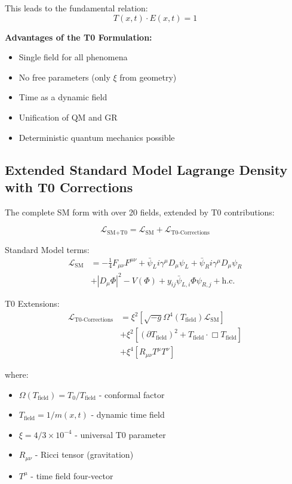 	This leads to the fundamental relation:
	\begin{equation}
		\boxed{T(x,t) \cdot E(x,t) = 1}
	\end{equation}
	
	\textbf{Advantages of the T0 Formulation:}
	\begin{itemize}
		\item Single field for all phenomena
		\item No free parameters (only $\xi$ from geometry)
		\item Time as a dynamic field
		\item Unification of QM and GR
		\item Deterministic quantum mechanics possible
	\end{itemize}
	
	\subsection{Extended Standard Model Lagrange Density with T0 Corrections}
	
	The complete SM form with over 20 fields, extended by T0 contributions:
	
	\begin{smbox}
		\begin{equation}
			\mathcal{L}_{\text{SM+T0}} = \mathcal{L}_{\text{SM}} + \mathcal{L}_{\text{T0-Corrections}}
		\end{equation}
		
		Standard Model terms:
		\begin{align}
			\mathcal{L}_{\text{SM}} &= -\frac{1}{4}F_{\mu\nu}F^{\mu\nu} + \bar{\psi}_L i\gamma^\mu D_\mu \psi_L + \bar{\psi}_R i\gamma^\mu D_\mu \psi_R \\
			&+ |D_\mu \Phi|^2 - V(\Phi) + y_{ij}\bar{\psi}_{L,i}\Phi\psi_{R,j} + \text{h.c.}
		\end{align}
		
		T0 Extensions:
		\begin{align}
			\mathcal{L}_{\text{T0-Corrections}} &= \xi^2 \left[ \sqrt{-g} \Omega^4(T_{\text{field}}) \mathcal{L}_{\text{SM}} \right] \\
			&+ \xi^2 \left[ (\partial T_{\text{field}})^2 + T_{\text{field}} \cdot \Box T_{\text{field}} \right] \\
			&+ \xi^4 \left[ R_{\mu\nu} T^{\mu} T^{\nu} \right]
		\end{align}
		
		where:
		\begin{itemize}
			\item $\Omega(T_{\text{field}}) = T_0/T_{\text{field}}$ - conformal factor
			\item $T_{\text{field}} = 1/m(x,t)$ - dynamic time field
			\item $\xi = 4/3 \times 10^{-4}$ - universal T0 parameter
			\item $R_{\mu\nu}$ - Ricci tensor (gravitation)
			\item $T^{\mu}$ - time field four-vector
		\end{itemize}
	\end{smbox}
	
